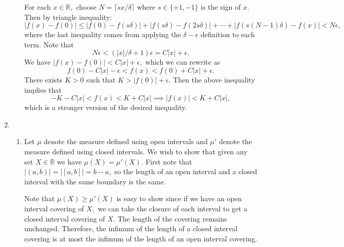 \documentclass{article}
\numberwithin{equation}{section}
\begin{document}
\begin{enumerate}
\begin{enumerate}[label=(\alph*)]
        For each $x\in \mathbb{R},$ choose $N = \lceil sx/\delta \rceil$ where $s \in \{+1,-1\}$ is the sign of $x.$ Then by triangle inequality:
        \begin{equation}
            |f(x)-f(0)| \le |f(0)-f(s\delta)| + |f(s\delta)-f(2s\delta)| + \cdots + |f(s(N-1)\delta)-f(x)|  < N\epsilon,
        \end{equation}
        where the last inequality comes from applying the $\delta-\epsilon$ definition to each term. Note that 
        \begin{equation}
            N\epsilon < (|x|/\delta + 1)\epsilon = C|x| + \epsilon.
        \end{equation}
        We have $|f(x)-f(0)| < C|x|+\epsilon,$ which we can rewrite as 
        \begin{equation}
            f(0) - C|x| - \epsilon < f(x) < f(0) + C|x| + \epsilon.
        \end{equation}
        There exists $K >0$ such that $K>|f(0)| + \epsilon.$ Then the above inequality implies that 
        \begin{equation}
            -K-C|x| < f(x) < K+C|x| \implies |f(x)| < K+C|x|,
        \end{equation}
        which is a stronger version of the desired inequality.
    \end{enumerate}
    \newpage
    \item \begin{enumerate}[label=(\alph*)]
        \item Let $\mu$ denote the measure defined using open intervals and $\mu'$ denote the measure defined using closed intervals. We wish to show that given any set $X\in \mathbb{R}$ we have $\mu(X)=\mu'(X).$ First note that $|(a,b)|=|[a,b]|=b-a,$ so the length of an open interval and a closed interval with the same boundary is the same.
        
        Note that $\mu(X) \ge \mu'(X)$ is easy to show since if we have an open interval covering of $X,$ we can take the closure of each interval to get a closed interval covering of $X.$ The length of the covering remains unchanged. Therefore, the infimum of the length of a closed interval covering is at most the infimum of the length of an open interval covering. 


\end{enumerate}
\end{enumerate}
\end{document}
